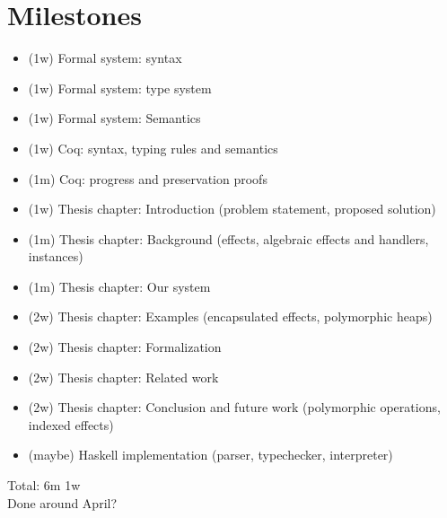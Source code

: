\documentclass[12pt]{article}
\begin{document}
\section{Milestones}
\begin{itemize}
\item (1w) Formal system: syntax
\item (1w) Formal system: type system
\item (1w) Formal system: Semantics
\item (1w) Coq: syntax, typing rules and semantics
\item (1m) Coq: progress and preservation proofs
\item (1w) Thesis chapter: Introduction (problem statement, proposed solution)
\item (1m) Thesis chapter: Background (effects, algebraic effects and handlers, instances)
\item (1m) Thesis chapter: Our system
\item (2w) Thesis chapter: Examples (encapsulated effects, polymorphic heaps)
\item (2w) Thesis chapter: Formalization
\item (2w) Thesis chapter: Related work
\item (2w) Thesis chapter: Conclusion and future work (polymorphic operations, indexed effects)
\item (maybe) Haskell implementation (parser, typechecker, interpreter) 
\end{itemize}

Total: 6m 1w \\
Done around April?
\end{document}
